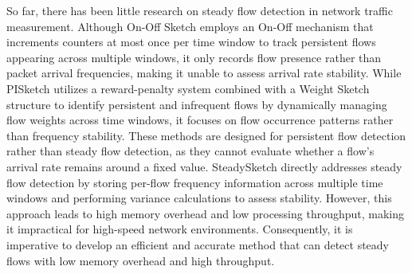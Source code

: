 \documentclass[preprint,12pt]{elsarticle}
\begin{document}
So far, there has been little research on steady flow detection in network traffic measurement. Although On-Off Sketch \cite{b22} employs an On-Off mechanism that increments counters at most once per time window to track persistent flows appearing across multiple windows, it only records flow presence rather than packet arrival frequencies, making it unable to assess arrival rate stability. While PISketch \cite{b19} utilizes a reward-penalty system combined with a Weight Sketch structure to identify persistent and infrequent flows by dynamically managing flow weights across time windows, it focuses on flow occurrence patterns rather than frequency stability. These methods are designed for persistent flow detection rather than steady flow detection, as they cannot evaluate whether a flow's arrival rate remains around a fixed value. SteadySketch \cite{b23} directly addresses steady flow detection by storing per-flow frequency information across multiple time windows and performing variance calculations to assess stability. However, this approach leads to high memory overhead and low processing throughput, making it impractical for high-speed network environments. Consequently, it is imperative to develop an efficient and accurate method that can detect steady flows with low memory overhead and high throughput.
\end{document}
